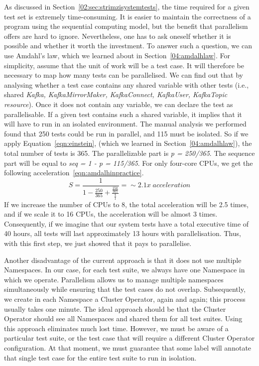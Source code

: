 As discussed in Section~\ref{02:sec:strimzisystemtests}, the time required for a given test set is extremely time-consuming.
It is easier to maintain the correctness of a program using the sequential computing model, but the benefit that parallelism offers are hard to ignore.
Nevertheless, one has to ask oneself whether it is possible and whether it worth the investment.
To answer such a question, we can use Amdahl's law, which we learned about in Section~\ref{04:amdalhlaw}.
For simplicity, assume that the unit of work will be a test case.
It will therefore be necessary to map how many tests can be parallelised.
We can find out that by analysing whether a test case contains any shared variable with other tests (i.e., shared \emph{Kafka, KafkaMirrorMaker, KafkaConnect, KafkaUser, KafkaTopic resource}).
Once it does not contain any variable, we can declare the test as parallelisable.
If a given test contains such a shared variable, it implies that it will have to run in an isolated environment.
The manual analysis we performed found that 250 tests could be run in parallel, and 115 must be isolated.
So if we apply Equation~\eqref{eqn:einstein}, (which we learned in Section~\ref{04:amdalhlaw}), the total number of tests is 365.
The parallelizable part is \emph{p = 250/365}.
The sequence part will be equal to \emph{seq = 1 - p = 115/365}.
For only four-core CPUs, we get the following acceleration~\eqref{eqn:amdalhinpractice}.
\begin{equation}
    \label{eqn:amdalhinpractice}
    S = \frac{1}{1 - \frac{250}{365} + \frac{\frac{250}{365}}{\frac{4}{1}}} =\sim 2.1x \; acceleration
    \tag{3}
\end{equation}
If we increase the number of CPUs to 8, the total acceleration will be 2.5 times, and if we scale it to 16 CPUs, the acceleration will be almost 3 times.
Consequently, if we imagine that our system tests have a total executive time of 40 hours, all tests will last approximately 13 hours with parallelisation.
Thus, with this first step, we just showed that it pays to parallelise.

Another disadvantage of the current approach is that it does not use multiple Namespaces.
In our case, for each test suite, we always have one Namespace in which we operate.
Parallelism allows us to manage multiple namespaces simultaneously while ensuring that the test cases do not overlap.
Subsequently, we create in each Namespace a Cluster Operator, again and again;
this process usually takes one minute.
The ideal approach should be that the Cluster Operator should see all Namespaces and shared them for all test suites.
Using this approach eliminates much lost time.
However, we must be aware of a particular test suite, or the test case that will require a different Cluster Operator configuration.
At that moment, we must guarantee that some label will annotate that single test case for the entire test suite to run in isolation.

